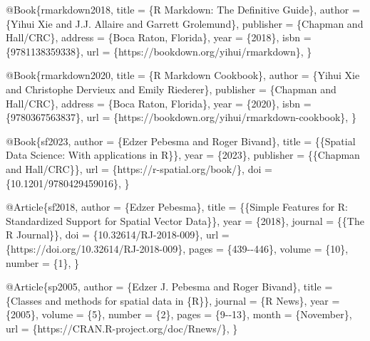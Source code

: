 \documentclass[
]{article}
\newenvironment{Shaded}{\begin{snugshade}}{\end{snugshade}}
\newcommand{\DataTypeTok}[1]{\textcolor[rgb]{0.13,0.29,0.53}{#1}}
\newcommand{\NormalTok}[1]{#1}
\newcommand{\OtherTok}[1]{\textcolor[rgb]{0.56,0.35,0.01}{#1}}
\newcommand{\VariableTok}[1]{\textcolor[rgb]{0.00,0.00,0.00}{#1}}
\begin{document}
\begin{Shaded}
\begin{Highlighting}[]
\VariableTok{@Book}\NormalTok{\{}\OtherTok{rmarkdown2018}\NormalTok{,}
  \DataTypeTok{title}\NormalTok{ = \{R Markdown: The Definitive Guide\},}
  \DataTypeTok{author}\NormalTok{ = \{Yihui Xie and J.J. Allaire and Garrett Grolemund\},}
  \DataTypeTok{publisher}\NormalTok{ = \{Chapman and Hall/CRC\},}
  \DataTypeTok{address}\NormalTok{ = \{Boca Raton, Florida\},}
  \DataTypeTok{year}\NormalTok{ = \{2018\},}
  \DataTypeTok{isbn}\NormalTok{ = \{9781138359338\},}
  \DataTypeTok{url}\NormalTok{ = \{https://bookdown.org/yihui/rmarkdown\},}
\NormalTok{\}}

\VariableTok{@Book}\NormalTok{\{}\OtherTok{rmarkdown2020}\NormalTok{,}
  \DataTypeTok{title}\NormalTok{ = \{R Markdown Cookbook\},}
  \DataTypeTok{author}\NormalTok{ = \{Yihui Xie and Christophe Dervieux and Emily Riederer\},}
  \DataTypeTok{publisher}\NormalTok{ = \{Chapman and Hall/CRC\},}
  \DataTypeTok{address}\NormalTok{ = \{Boca Raton, Florida\},}
  \DataTypeTok{year}\NormalTok{ = \{2020\},}
  \DataTypeTok{isbn}\NormalTok{ = \{9780367563837\},}
  \DataTypeTok{url}\NormalTok{ = \{https://bookdown.org/yihui/rmarkdown{-}cookbook\},}
\NormalTok{\}}

\VariableTok{@Book}\NormalTok{\{}\OtherTok{sf2023}\NormalTok{,}
  \DataTypeTok{author}\NormalTok{ = \{Edzer Pebesma and Roger Bivand\},}
  \DataTypeTok{title}\NormalTok{ = \{\{Spatial Data Science: With applications in R\}\},}
  \DataTypeTok{year}\NormalTok{ = \{2023\},}
  \DataTypeTok{publisher}\NormalTok{ = \{\{Chapman and Hall/CRC\}\},}
  \DataTypeTok{url}\NormalTok{ = \{https://r{-}spatial.org/book/\},}
  \DataTypeTok{doi}\NormalTok{ = \{10.1201/9780429459016\},}
\NormalTok{\}}

\VariableTok{@Article}\NormalTok{\{}\OtherTok{sf2018}\NormalTok{,}
  \DataTypeTok{author}\NormalTok{ = \{Edzer Pebesma\},}
  \DataTypeTok{title}\NormalTok{ = \{\{Simple Features for R: Standardized Support for Spatial Vector Data\}\},}
  \DataTypeTok{year}\NormalTok{ = \{2018\},}
  \DataTypeTok{journal}\NormalTok{ = \{\{The R Journal\}\},}
  \DataTypeTok{doi}\NormalTok{ = \{10.32614/RJ{-}2018{-}009\},}
  \DataTypeTok{url}\NormalTok{ = \{https://doi.org/10.32614/RJ{-}2018{-}009\},}
  \DataTypeTok{pages}\NormalTok{ = \{439{-}{-}446\},}
  \DataTypeTok{volume}\NormalTok{ = \{10\},}
  \DataTypeTok{number}\NormalTok{ = \{1\},}
\NormalTok{\}}

\VariableTok{@Article}\NormalTok{\{}\OtherTok{sp2005}\NormalTok{,}
  \DataTypeTok{author}\NormalTok{ = \{Edzer J. Pebesma and Roger Bivand\},}
  \DataTypeTok{title}\NormalTok{ = \{Classes and methods for spatial data in \{R\}\},}
  \DataTypeTok{journal}\NormalTok{ = \{R News\},}
  \DataTypeTok{year}\NormalTok{ = \{2005\},}
  \DataTypeTok{volume}\NormalTok{ = \{5\},}
  \DataTypeTok{number}\NormalTok{ = \{2\},}
  \DataTypeTok{pages}\NormalTok{ = \{9{-}{-}13\},}
  \DataTypeTok{month}\NormalTok{ = \{November\},}
  \DataTypeTok{url}\NormalTok{ = \{https://CRAN.R{-}project.org/doc/Rnews/\},}
\NormalTok{\}}


\end{Highlighting}
\end{Shaded}
\end{document}
